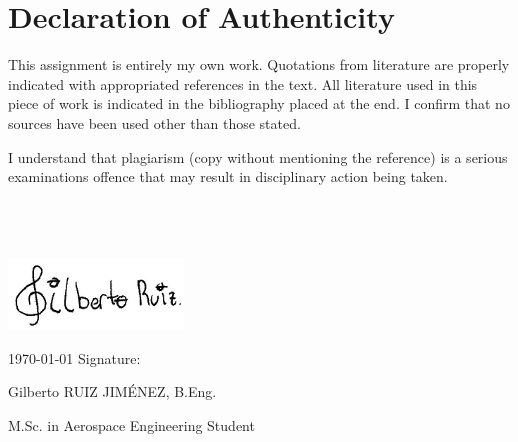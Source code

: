 \section*{Declaration of Authenticity}

\vspace{0.5cm}
This assignment is entirely my own work. Quotations from literature are properly indicated with appropriated references in the text. All literature used in this piece of work is indicated in the bibliography placed at the end. I confirm that no sources have been used other than those stated. \par 
I understand that plagiarism (copy without mentioning the reference) is a serious examinations offence that may result in disciplinary action being taken.
\\
\\
\\
\\
\begin{center}
\includegraphics[width=0.35\textwidth]{images/Firma.png}    
\end{center}

\vspace{-0.8cm} 
\today \hspace{6 pt} Signature: \hrulefill

\hspace*{12mm}\phantom{\today  Signature: }Gilberto RUIZ JIMÉNEZ, B.Eng.

\hspace*{6mm}\phantom{\today  Signature: }M.Sc. in Aerospace Engineering Student
